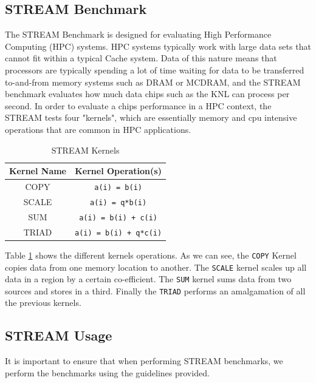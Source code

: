 \documentclass[bsc,frontabs,twoside,singlespacing,parskip,deptreport]{infthesis}     %
\begin{document}
\subsection{STREAM Benchmark}
The STREAM Benchmark is designed for evaluating High Performance Computing (HPC) systems. HPC systems typically work with large data sets that cannot fit within a typical Cache system. Data of this nature means that processors are typically spending a lot of time waiting for data to be transferred to-and-from memory systems such as DRAM or MCDRAM, and the STREAM benchmark evaluates how much data chips such as the KNL can process per second. In order to evaluate a chips performance in a HPC context, the STREAM tests four "kernels", which are essentially memory and cpu intensive operations that are common in HPC applications.

\begin{table}[!h]
\begin{center}
\caption{STREAM Kernels}
\label{fig:stream-kernels}
\begin{tabular}{ |c|c| } 
    \hline
    Kernel Name & Kernel Operation(s) \\
    \hline\hline
    COPY    & \texttt{a(i) = b(i)} \\
    \hline
    SCALE   & \texttt{a(i) = q*b(i)} \\
    \hline
    SUM     & \texttt{a(i) = b(i) + c(i)} \\
    \hline
    TRIAD   & \texttt{a(i) = b(i) + q*c(i)} \\
    \hline
\end{tabular}
\end{center}
\end{table}

Table \ref{fig:stream-kernels} shows the different kernels operations. As we can see, the \texttt{COPY} Kernel copies data from one memory location to another. The \texttt{SCALE} kernel scales up all data in a region by a certain co-efficient. The \texttt{SUM} kernel sums data from two sources and stores in a third. Finally the \texttt{TRIAD} performs an amalgamation of all the previous kernels.

\subsection{STREAM Usage}
It is important to ensure that when performing STREAM benchmarks, we perform the benchmarks using the guidelines provided.
\end{document}
